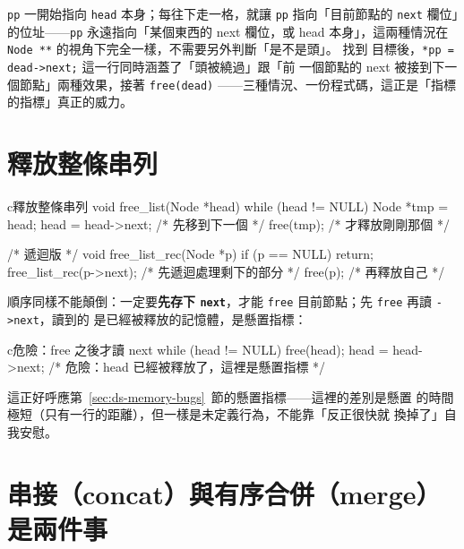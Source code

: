 
\texttt{pp} 一開始指向 \texttt{head} 本身；每往下走一格，就讓
\texttt{pp} 指向「目前節點的 \texttt{next} 欄位」的位址——\texttt{pp}
永遠指向「某個東西的 next 欄位，或 head 本身」，這兩種情況在
\texttt{Node **} 的視角下完全一樣，不需要另外判斷「是不是頭」。 找到
目標後，\texttt{*pp = dead->next;} 這一行同時涵蓋了「頭被繞過」跟「前
一個節點的 next 被接到下一個節點」兩種效果，接著 \texttt{free(dead)}
——三種情況、一份程式碼，這正是「指標的指標」真正的威力。


\section{釋放整條串列}
\label{sec:ds-free-list}

\begin{code}{c}{釋放整條串列}
void free_list(Node *head) {
    while (head != NULL) {
        Node *tmp = head;
        head = head->next;  /* 先移到下一個 */
        free(tmp);           /* 才釋放剛剛那個 */
    }
}

/* 遞迴版 */
void free_list_rec(Node *p) {
    if (p == NULL) return;
    free_list_rec(p->next); /* 先遞迴處理剩下的部分 */
    free(p);                 /* 再釋放自己 */
}
\end{code}

順序同樣不能顛倒：一定要\textbf{先存下 \texttt{next}}，才能
\texttt{free} 目前節點；先 \texttt{free} 再讀 \texttt{->next}，讀到的
是已經被釋放的記憶體，是懸置指標：

\begin{code}{c}{危險：free 之後才讀 next}
while (head != NULL) {
    free(head);
    head = head->next;  /* 危險：head 已經被釋放了，這裡是懸置指標 */
}
\end{code}

這正好呼應第~\ref{sec:ds-memory-bugs}~節的懸置指標——這裡的差別是懸置
的時間極短（只有一行的距離），但一樣是未定義行為，不能靠「反正很快就
換掉了」自我安慰。


\section{串接（concat）與有序合併（merge）是兩件事}
\label{sec:ds-merge}

